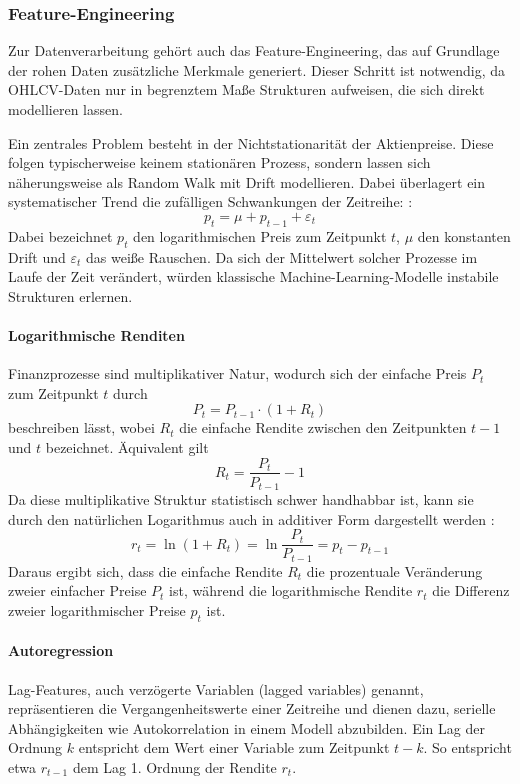 \subsubsection{Feature-Engineering} \label{features}
Zur Datenverarbeitung gehört auch das Feature-Engineering, das auf Grundlage der rohen Daten zusätzliche Merkmale generiert. Dieser Schritt ist notwendig, da OHLCV-Daten nur in begrenztem Maße Strukturen aufweisen, die sich direkt modellieren lassen.

Ein zentrales Problem besteht in der Nichtstationarität der Aktienpreise. Diese folgen typischerweise keinem stationären Prozess, sondern lassen sich näherungsweise als Random Walk mit Drift modellieren. Dabei überlagert ein systematischer Trend die zufälligen Schwankungen der Zeitreihe:
\cite[S.~65]{tsay_analysis_2005}:
\begin{equation}
    p_t = \mu + p_{t-1} + \varepsilon_t
\end{equation}
Dabei bezeichnet $p_t$ den logarithmischen Preis zum Zeitpunkt $t$, $\mu$ den konstanten Drift und $\varepsilon_t$ das weiße Rauschen. Da sich der Mittelwert solcher Prozesse im Laufe der Zeit verändert,  würden klassische Machine-Learning-Modelle instabile Strukturen erlernen.
\cite[S.~64]{tsay_analysis_2005}

\paragraph{Logarithmische Renditen}
Finanzprozesse sind multiplikativer Natur, wodurch sich der einfache Preis $P_t$ zum Zeitpunkt $t$ durch \cite[S.~3]{tsay_analysis_2005}
\[
  P_t = P_{t-1} \cdot (1 + R_t)
\]
beschreiben lässt, wobei $R_t$ die einfache Rendite zwischen den Zeitpunkten $t-1$ und $t$ bezeichnet. Äquivalent gilt
\[
  R_t = \frac{P_t}{P_{t-1}}-1
\]
Da diese multiplikative Struktur statistisch schwer handhabbar ist, kann sie durch den natürlichen Logarithmus auch in additiver Form dargestellt werden \cite[S.~5]{tsay_analysis_2005}:
\begin{equation}
    r_t = \ln(1+R_t) = \ln \frac{P_t}{P_{t-1}} = p_t - p_{t-1}
\end{equation}
Daraus ergibt sich, dass die einfache Rendite $R_t$ die prozentuale Veränderung zweier einfacher Preise $P_t$ ist, während die logarithmische Rendite $r_t$ die Differenz zweier logarithmischer Preise $p_t$ ist.

\paragraph{Autoregression} \label{autoregression}
Lag-Features, auch verzögerte Variablen (lagged variables) genannt, repräsentieren die Vergangenheitswerte einer Zeitreihe und dienen dazu, serielle Abhängigkeiten wie Autokorrelation in einem Modell abzubilden. Ein Lag der Ordnung $k$ entspricht dem Wert einer Variable zum Zeitpunkt $t-k$. So entspricht etwa $r_{t-1}$ dem Lag 1. Ordnung der Rendite $r_t$.

